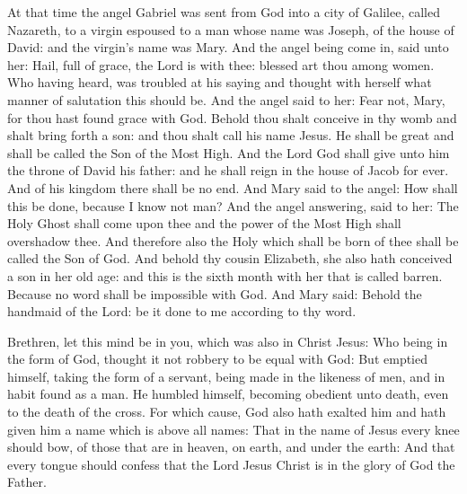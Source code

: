 \begin{multicols}{2}
At that time the angel Gabriel was sent from God into a
city of Galilee, called Nazareth,
to a virgin espoused to a man whose name was Joseph, of the house
of David: and the virgin's name was Mary.
And the angel being come in, said unto her: Hail, full of grace,
the Lord is with thee: blessed art thou among women.
Who having heard, was troubled at his saying and thought with
herself what manner of salutation this should be.
And the angel said to her: Fear not, Mary, for thou hast found
grace with God.
Behold thou shalt conceive in thy womb and shalt bring forth a
son: and thou shalt call his name Jesus.
He shall be great and shall be called the Son of the Most High.
And the Lord God shall give unto him the throne of David his father: and
he shall reign in the house of Jacob for ever.
And of his kingdom there shall be no end.
And Mary said to the angel: How shall this be done, because I know
not man?
And the angel answering, said to her: The Holy Ghost shall come
upon thee and the power of the Most High shall overshadow thee. And
therefore also the Holy which shall be born of thee shall be called the
Son of God.
And behold thy cousin Elizabeth, she also hath conceived a son in
her old age: and this is the sixth month with her that is called barren.
Because no word shall be impossible with God.
And Mary said: Behold the handmaid of the Lord: be it done to me
according to thy word. %


\bigskip



Brethren, let this mind be in you, which was also in Christ Jesus: Who being in the
form of God, thought it not robbery to be equal with God: But emptied himself,
taking the form of a servant, being made in the likeness of men, and in habit
found as a man.
  He humbled
himself, becoming obedient unto death, even to the death of the cross.  For
which cause, God also hath exalted him and hath given him a name which is above
all names: That in the name of Jesus every knee should bow, of those that are
in heaven, on earth, and under the earth: And that every tongue should confess
that the Lord Jesus Christ is in the glory of God the Father.




\end{multicols}

